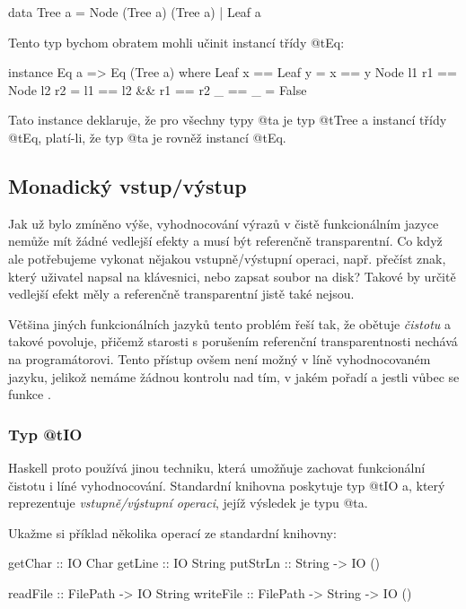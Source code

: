 \begin{haskell}
data Tree a = Node (Tree a) (Tree a) | Leaf a
\end{haskell}

Tento typ bychom obratem mohli učinit instancí třídy @t{Eq}:

\begin{haskell}
instance Eq a => Eq (Tree a) where
  Leaf x == Leaf y         = x == y
  Node l1 r1 == Node l2 r2 = l1 == l2 && r1 == r2
  _ == _ = False
\end{haskell}

Tato instance deklaruje, že pro všechny typy @t{a} je typ @t{Tree a} instancí
třídy @t{Eq}, platí-li, že typ @t{a} je rovněž instancí @t{Eq}.

\subsection{Monadický vstup/výstup}

Jak už bylo zmíněno výše, vyhodnocování výrazů v čistě funkcionálním jazyce
nemůže mít žádné vedlejší efekty a musí být referenčně transparentní. Co když
ale potřebujeme vykonat nějakou vstupně/výstupní operaci, např. přečíst znak,
který uživatel napsal na klávesnici, nebo zapsat soubor na disk? Takové
 by určitě vedlejší efekt měly a referenčně transparentní jistě také
nejsou.

Většina jiných funkcionálních jazyků tento problém řeší tak, že obětuje
\emph{čistotu} a takové  povoluje, přičemž starosti s
porušením referenční transparentnosti nechává na programátorovi. Tento přístup
ovšem není možný v líně vyhodnocovaném jazyku, jelikož nemáme žádnou kontrolu
nad tím, v jakém pořadí a jestli vůbec se funkce .

\subsubsection{\texorpdfstring{Typ @t{IO}}{Typ IO}}

Haskell proto používá jinou techniku, která umožňuje zachovat funkcionální
čistotu i líné vyhodnocování. Standardní knihovna poskytuje typ @t{IO a}, který
reprezentuje \emph{vstupně/výstupní operaci}, jejíž výsledek je typu @t{a}.

Ukažme si příklad několika operací ze standardní knihovny:

\begin{haskell}
getChar :: IO Char
getLine :: IO String
putStrLn :: String -> IO ()

readFile :: FilePath -> IO String
writeFile :: FilePath -> String -> IO ()
\end{haskell}

